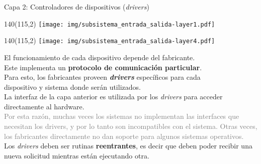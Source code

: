 \documentclass[aspectratio=169]{beamer}
\begin{document}
\begin{frame}{Capa 2: Controladores de dispositivos (\textit{drivers})}
    \begin{textblock}{140}(115,2) \texttt{[image: img/subsistema\_entrada\_salida-layer1.pdf]} \end{textblock}
    \begin{textblock}{140}(115,2) \texttt{[image: img/subsistema\_entrada\_salida-layer4.pdf]} \end{textblock}
    El funcionamiento de cada dispositivo depende del fabricante.\\
    Este implementa un \textbf{protocolo de comunicación particular}.\\
    \bigskip
    Para esto, los fabricantes proveen \textbf{\emph{drivers}} específicos para cada\\
    dispositivo y sistema donde serán utilizados.\\
    \bigskip
    \textcolor{naranjauca}{La interfaz de la capa anterior es utilizada por los \emph{drivers} para acceder directamente al hardware.\\}
    \pause
    \bigskip
    \textcolor{gray}{Por esta razón, muchas veces los sistemas no implementan las interfaces que necesitan los drivers, y por lo tanto son incompatibles con el sistema.
    Otras veces, los fabricantes directamente no dan soporte para algunos sistemas operativos.}\\
    \bigskip
    Los \textit{drivers} deben ser rutinas \textcolor{naranjauca}{\textbf{reentrantes}}, es decir que deben poder recibir una nueva solicitud mientras están ejecutando otra.
\end{frame}
\end{document}
